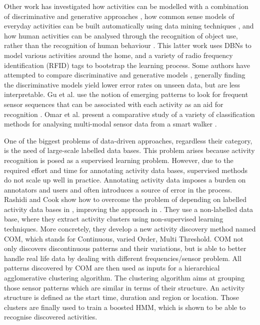 Other work has investigated how activities can be modelled with a combination of discriminative and generative approaches \cite{Lester2005}, how common sense models of everyday activities can be built automatically using data mining techniques \cite{Pentney2008} \cite{Pentney2007}, and how human activities can be analysed through the recognition of object use, rather than the recognition of human behaviour \cite{Wu2007}. This latter work uses DBNs to model various activities around the home, and a variety of radio frequency identification (RFID) tags to bootstrap the learning process. Some authors have attempted to compare discriminative and generative models \cite{Bao2004} \cite{Ravi2005}, generally finding the discriminative models yield lower error rates on unseen data, but are less interpretable. Gu et al. use the notion of emerging patterns to look for frequent sensor sequences that can be associated with each activity as an aid for recognition \cite{Gu2009}. Omar et al. present a comparative study of a variety of classification methods for analysing multi-modal sensor data from a smart walker \cite{Omar2010}.

One of the biggest problems of data-driven approaches, regardless their category, is the need of large-scale labelled data bases. This problem arises because activity recognition is posed as a supervised learning problem. However, due to the required effort and time for annotating activity data bases, supervised methods do not scale up well in practice. Annotating activity data imposes a burden on annotators and users and often introduces a source of error in the process. Rashidi and Cook show how to overcome the problem of depending on labelled activity data bases in \cite{Rashidi2011}, improving the approach in \cite{Rashidi2013}. They use a non-labelled data base, where they extract activity clusters using non-supervised learning techniques. More concretely, they develop a new activity discovery method named COM, which stands for Continuous, varied Order, Multi Threshold. COM not only discovers discontinuous patterns and their variations, but is able to better handle real life data by dealing with different frequencies/sensor problem. All patterns discovered by COM are then used as inputs for a hierarchical agglomerative clustering algorithm. The clustering algorithm aims at grouping those sensor patterns which are similar in terms of their structure. An activity structure is defined as the start time, duration and region or location. Those clusters are finally used to train a boosted HMM, which is shown to be able to recognise discovered activities. 

